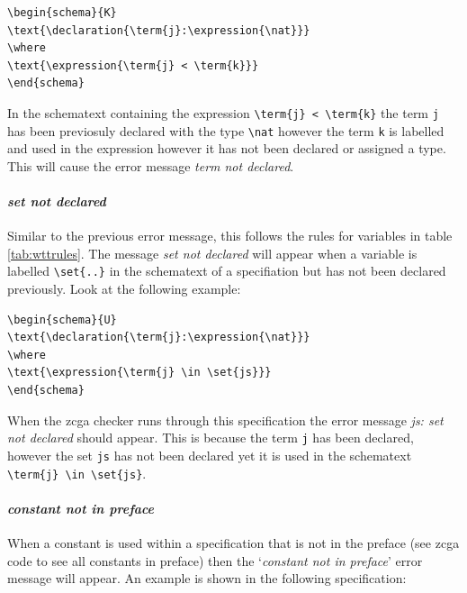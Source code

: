 \begin{exam}
\label{Kexam}
\begin{verbatim}
\begin{schema}{K}
\text{\declaration{\term{j}:\expression{\nat}}}
\where
\text{\expression{\term{j} < \term{k}}}
\end{schema}
\end{verbatim}
\end{exam}

In the schematext containing the expression \verb|\term{j} < \term{k}| the term \verb|j| has been previosuly declared with the type \verb|\nat| however the term \verb|k| is labelled and used in the expression however it has not been declared or assigned a type. This will cause the error message \emph{term not declared}.

\paragraph{\emph{set not declared}}

Similar to the previous error message, this follows the rules for variables in table \ref{tab:wttrules}. The message \emph{set not declared} will appear when a variable is labelled \verb|\set{..}| in the schematext of a specifiation but has not been declared previously. Look at the following example:

\begin{exam}
\begin{verbatim}       
\begin{schema}{U}
\text{\declaration{\term{j}:\expression{\nat}}}
\where
\text{\expression{\term{j} \in \set{js}}}
\end{schema}
\end{verbatim}
\end{exam}

When the \gls{zcga} checker runs through this specification the error message \emph{js: set not declared} should appear. This is because the term \verb|j| has been declared, however the set \verb|js| has not been declared yet it is used in the schematext \verb|\term{j} \in \set{js}|.

\paragraph{\emph{constant not in preface}}

When a constant is used within a specification that is not in the preface (see \gls{zcga} code to see all constants in preface) then the `\emph{constant not in preface}' error message will appear. An example is shown in the following specification:

